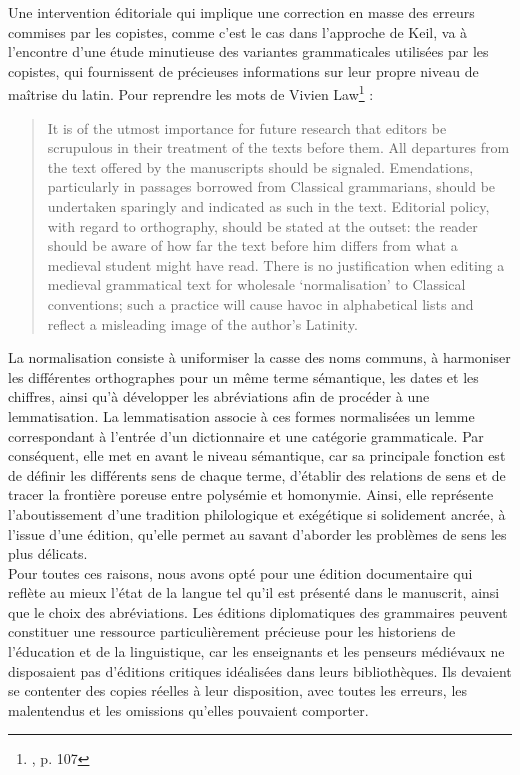 \documentclass[a4paper, twoside, 12pt]{book}
\begin{document}
Une intervention éditoriale qui implique une correction en masse des \og{}erreurs\fg{} commises par les copistes, comme c'est le cas dans l'approche de Keil, va à l'encontre d'une étude minutieuse des variantes grammaticales utilisées par les copistes, qui fournissent de précieuses informations sur leur propre niveau de maîtrise du latin. Pour reprendre les mots de Vivien Law\footnote{\cite{law1982insular}, p. 107} :

\blockquote{It is of the utmost importance for future research that editors be scrupulous in their treatment of the texts before them. All departures from the text offered by the manuscripts should be signaled. Emendations, particularly in passages borrowed from Classical grammarians, should be undertaken sparingly and indicated as such in the text. Editorial policy, with regard to orthography, should be stated at the outset: the reader should be aware of how far the text before him differs from what a medieval student might have read. There is no justification when editing a medieval grammatical text for wholesale ‘normalisation’ to Classical conventions; such a practice will cause havoc in alphabetical lists and reflect a misleading image of the author’s Latinity.} 

La normalisation consiste à uniformiser la casse des noms communs, à harmoniser les différentes orthographes pour un même terme sémantique, les dates et les chiffres, ainsi qu'à développer les abréviations afin de procéder à une lemmatisation. La lemmatisation associe à ces formes normalisées un lemme correspondant à l'entrée d'un dictionnaire et une catégorie grammaticale. Par conséquent, elle met en avant le niveau sémantique, car sa principale fonction est de définir les différents sens de chaque terme, d'établir des relations de sens et de tracer la frontière poreuse entre polysémie et homonymie. Ainsi, elle représente l'aboutissement d'une tradition philologique et exégétique si solidement ancrée, à l'issue d'une édition, qu'elle permet au savant d'aborder les problèmes de sens les plus délicats.\\

Pour toutes ces raisons, nous avons opté pour une édition documentaire qui reflète au mieux l'état de la langue tel qu'il est présenté dans le manuscrit, ainsi que le choix des abréviations. Les éditions diplomatiques des grammaires peuvent constituer une ressource particulièrement précieuse pour les historiens de l'éducation et de la linguistique, car les enseignants et les penseurs médiévaux ne disposaient pas d'éditions critiques idéalisées dans leurs bibliothèques. Ils devaient se contenter des copies réelles à leur disposition, avec toutes les erreurs, les malentendus et les omissions qu'elles pouvaient comporter.\\
\end{document}
